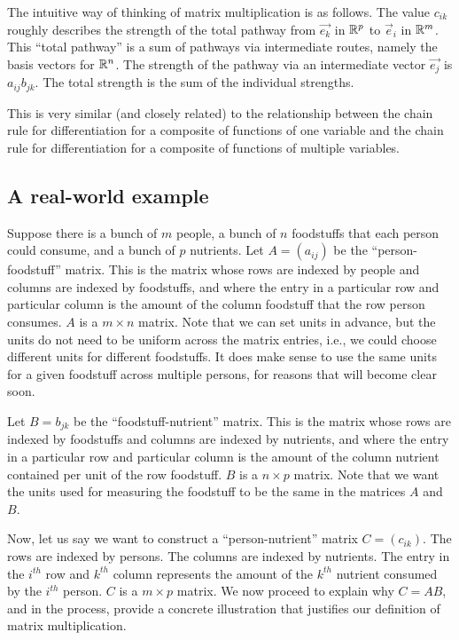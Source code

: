 \documentclass[10pt]{amsart}
\begin{document}
The intuitive way of thinking of matrix multiplication is as
follows. The value $c_{ik}$ roughly describes the strength of the
total pathway from $\vec{e_k}$ in $\mathbb{R}^p$ to $\vec{e}_i$ in
$\mathbb{R}^m$. This ``total pathway'' is a sum of pathways via intermediate
routes, namely the basis vectors for $\mathbb{R}^n$. The strength of the
pathway via an intermediate vector $\vec{e_j}$ is $a_{ij}b_{jk}$. The
total strength is the sum of the individual strengths.

This is very similar (and closely related) to the relationship between
the chain rule for differentiation for a composite of functions of one
variable and the chain rule for differentiation for a composite of
functions of multiple variables.

\subsection{A real-world example}

Suppose there is a bunch of $m$ people, a bunch of $n$ foodstuffs that
each person could consume, and a bunch of $p$ nutrients. Let $A =
(a_{ij})$ be the ``person-foodstuff'' matrix. This is the matrix
whose rows are indexed by people and columns are indexed by
foodstuffs, and where the entry in a particular row and particular
column is the amount of the column foodstuff that the row person
consumes. $A$ is a $m \times n$ matrix. Note that we can set units in
advance, but the units do not need to be uniform across the matrix
entries, i.e., we could choose different units for different
foodstuffs. It does make sense to use the same units for a given
foodstuff across multiple persons, for reasons that will become clear
soon.

Let $B = b_{jk}$ be the ``foodstuff-nutrient'' matrix. This is the matrix
whose rows are indexed by foodstuffs and columns are indexed by
nutrients, and where the entry in a particular row and particular
column is the amount of the column nutrient contained per unit of the
row foodstuff. $B$ is a $n \times p$ matrix. Note that we want the
units used for measuring the foodstuff to be the same in the matrices
$A$ and $B$.

Now, let us say we want to construct a ``person-nutrient'' matrix
$C = (c_{ik})$. The rows are indexed by persons. The columns are indexed by
nutrients. The entry in the $i^{th}$ row and $k^{th}$ column
represents the amount of the $k^{th}$ nutrient consumed by the
$i^{th}$ person. $C$ is a $m \times p$ matrix. We now proceed to
explain why $C = AB$, and in the process, provide a concrete
illustration that justifies our definition of matrix multiplication.
\end{document}
